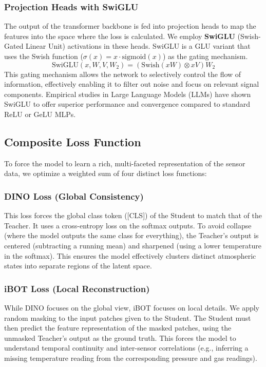 \documentclass[conference]{IEEEtran}
\begin{document}
    \subsubsection{Projection Heads with SwiGLU}
    The output of the transformer backbone is fed into projection heads to map the features into the space where the loss is calculated. We employ \textbf{SwiGLU} (Swish-Gated Linear Unit) activations in these heads. SwiGLU is a GLU variant that uses the Swish function ($\sigma(x) = x \cdot \mathrm{sigmoid}(x)$) as the gating mechanism.
    \begin{equation}
        \mathrm{SwiGLU}(x, W, V, W_2) = (\mathrm{Swish}(xW) \otimes xV)W_2
    \end{equation}
    This gating mechanism allows the network to selectively control the flow of information, effectively enabling it to filter out noise and focus on relevant signal components. Empirical studies in Large Language Models (LLMs) have shown SwiGLU to offer superior performance and convergence compared to standard ReLU or GeLU MLPs.

    \subsection{Composite Loss Function}
    To force the model to learn a rich, multi-faceted representation of the sensor data, we optimize a weighted sum of four distinct loss functions:

    \subsubsection{DINO Loss (Global Consistency)}
    This loss forces the global class token ([CLS]) of the Student to match that of the Teacher. It uses a cross-entropy loss on the softmax outputs. To avoid collapse (where the model outputs the same class for everything), the Teacher's output is centered (subtracting a running mean) and sharpened (using a lower temperature in the softmax). This ensures the model effectively clusters distinct atmospheric states into separate regions of the latent space.

    \subsubsection{iBOT Loss (Local Reconstruction)}
    While DINO focuses on the global view, iBOT focuses on local details. We apply random masking to the input patches given to the Student. The Student must then predict the feature representation of the masked patches, using the unmasked Teacher's output as the ground truth. This forces the model to understand temporal continuity and inter-sensor correlations (e.g., inferring a missing temperature reading from the corresponding pressure and gas readings).
\end{document}

